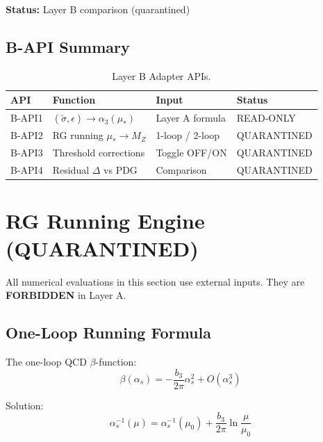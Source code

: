 \documentclass[11pt,a4paper]{article}
\theoremstyle{definition}
\begin{document}
\textbf{Status:} Layer B comparison (quarantined)

\subsection{B-API Summary}
\label{subsec:b-api-summary}

\begin{table}[ht]
\centering
\caption{Layer B Adapter APIs.}
\label{tab:b-api-summary}
\begin{tabular}{llll}
\toprule
API & Function & Input & Status \\
\midrule
B-API1 & $(\tilde{\sigma}, \epsilon) \to \alpha_3(\mu_*)$ & Layer A formula & READ-ONLY \\
B-API2 & RG running $\mu_* \to M_Z$ & 1-loop / 2-loop & QUARANTINED \\
B-API3 & Threshold corrections & Toggle OFF/ON & QUARANTINED \\
B-API4 & Residual $\Delta$ vs PDG & Comparison & QUARANTINED \\
\bottomrule
\end{tabular}
\end{table}

\section{RG Running Engine (QUARANTINED)}
\label{sec:rg-engine}

\begin{quarantinebox}
All numerical evaluations in this section use external inputs.
They are \textbf{FORBIDDEN} in Layer A.
\end{quarantinebox}

\subsection{One-Loop Running Formula}
\label{subsec:1loop-running}

The one-loop QCD $\beta$-function:
\begin{equation}
\label{eq:beta-qcd}
\beta(\alpha_s) = -\frac{b_3}{2\pi} \alpha_s^2 + O(\alpha_s^3)
\end{equation}

Solution:
\begin{equation}
\label{eq:1loop-solution}
\alpha_s^{-1}(\mu) = \alpha_s^{-1}(\mu_0) + \frac{b_3}{2\pi} \ln\frac{\mu}{\mu_0}
\end{equation}
\end{document}

